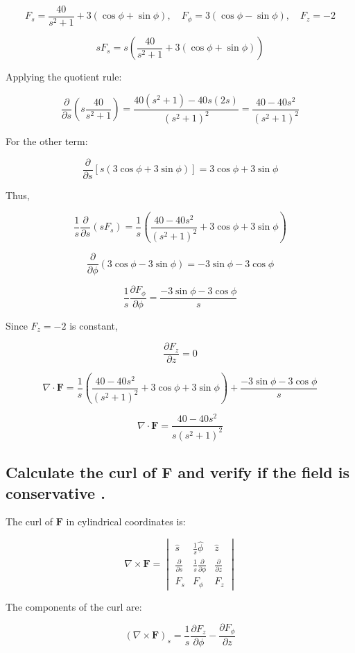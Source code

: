 \documentclass[a4paper,12pt]{article}
\begin{document}
\[
F_s = \frac{40}{s^2 + 1} + 3(\cos\phi + \sin\phi), \quad
F_\phi = 3(\cos\phi - \sin\phi), \quad
F_z = -2
\]


\[
s F_s = s \left( \frac{40}{s^2 + 1} + 3(\cos\phi + \sin\phi) \right)
\]

Applying the quotient rule:

\[
\frac{\partial}{\partial s} \left( s \frac{40}{s^2 + 1} \right) = \frac{40(s^2 + 1) - 40s(2s)}{(s^2+1)^2} = \frac{40 - 40s^2}{(s^2+1)^2}
\]

For the other term:

\[
\frac{\partial}{\partial s} [s(3\cos\phi + 3\sin\phi)] = 3\cos\phi + 3\sin\phi
\]

Thus,

\[
\frac{1}{s} \frac{\partial}{\partial s} (s F_s) = \frac{1}{s} \left( \frac{40 - 40s^2}{(s^2+1)^2} + 3\cos\phi + 3\sin\phi \right)
\]


\[
\frac{\partial}{\partial \phi} (3\cos\phi - 3\sin\phi) = -3\sin\phi - 3\cos\phi
\]

\[
\frac{1}{s} \frac{\partial F_\phi}{\partial \phi} = \frac{-3\sin\phi - 3\cos\phi}{s}
\]

Since \( F_z = -2 \) is constant,

\[
\frac{\partial F_z}{\partial z} = 0
\]


\[
\nabla \cdot \mathbf{F} = \frac{1}{s} \left( \frac{40 - 40s^2}{(s^2+1)^2} + 3\cos\phi + 3\sin\phi \right) + \frac{-3\sin\phi - 3\cos\phi}{s}
\]

\[
\boxed{\nabla \cdot \mathbf{F}= \frac{40 - 40s^2}{s(s^2+1)^2}}
\]

\subsection{Calculate the curl of \( \mathbf{F} \) and verify if the field is conservative .}


The curl of \( \mathbf{F} \) in cylindrical coordinates is:

\[
\nabla \times \mathbf{F} =
\begin{vmatrix}
\hat{s} & \frac{1}{s} \hat{\phi} & \hat{z} \\
\frac{\partial}{\partial s} & \frac{1}{s} \frac{\partial}{\partial \phi} & \frac{\partial}{\partial z} \\
F_s & F_\phi & F_z
\end{vmatrix}
\]

The components of the curl are:

\[
(\nabla \times \mathbf{F})_s = \frac{1}{s} \frac{\partial F_z}{\partial \phi} - \frac{\partial F_\phi}{\partial z}
\]
\end{document}
